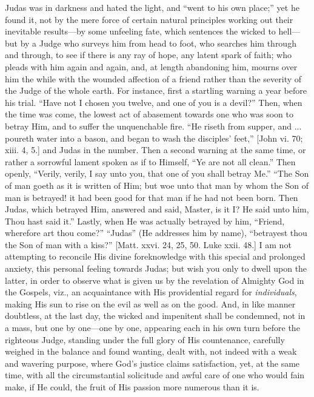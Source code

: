 Judas was in darkness and hated the light, and ``went to his
own place;'' yet he found it, not by the mere force of certain
natural principles working out their inevitable results—by some
unfeeling fate, which sentences the wicked to hell—but by a Judge
who surveys him from head to foot, who searches him through and
through, to see if there is any ray of hope, any latent spark of
faith; who pleads with him again and again, and, at length abandoning
him, mourns over him the while with the wounded affection of a friend
rather than the severity of the Judge of the whole earth. For
instance, first a startling warning a year before his trial.
``Have not I chosen you twelve, and one of you is a devil?''
Then, when the time was come, the lowest act of abasement towards one
who was soon to betray Him, and to suffer the unquenchable fire.
``He riseth from supper, and ... poureth water into a bason, and
began to wash the disciples' feet,'' [John vi. 70; xiii. 4, 5.]
and Judas in the number. Then a second warning at the same time, or
rather a sorrowful lament spoken as if to Himself, ``Ye are not
all clean.'' Then openly, ``Verily, verily, I say unto you,
that one of you shall betray Me.'' ``The Son of man goeth as
it is written of Him; but woe unto that man by whom the Son
of man is betrayed! it had been good for that man if he had not been
born. Then Judas, which betrayed Him, answered and said, Master, is it
I? He said unto him, Thou hast said it.'' Lastly, when He was
actually betrayed by him, ``Friend, wherefore art thou come?''
``Judas'' (He addresses him by name), ``betrayest thou the
Son of man with a kiss?'' [Matt. xxvi. 24, 25, 50. Luke xxii. 48.]
I am not attempting to reconcile His divine foreknowledge with this
special and prolonged anxiety, this personal feeling towards Judas;
but wish you only to dwell upon the latter, in order to observe what
is given us by the revelation of Almighty God in the Gospels, viz., an
acquaintance with His providential regard for \emph{individuals},
making His sun to rise on the evil as well as on the good. And, in
like manner doubtless, at the last day, the wicked and impenitent
shall be condemned, not in a mass, but one by one—one by one,
appearing each in his own turn before the righteous Judge, standing
under the full glory of His countenance, carefully weighed in the
balance and found wanting, dealt with, not indeed with a weak and
wavering purpose, where God's justice claims satisfaction, yet, at the
same time, with all the circumstantial solicitude and awful care of
one who would fain make, if He could, the fruit of His passion more
numerous than it is.

